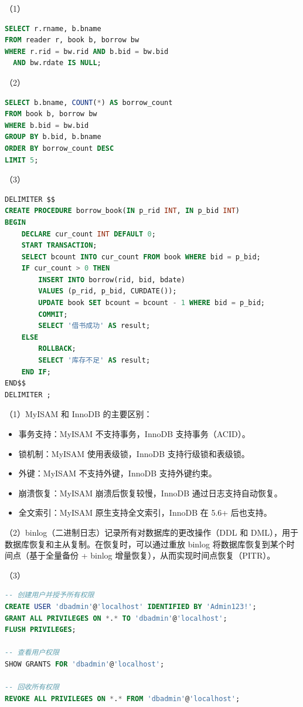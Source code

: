 \documentclass[a4paper,11pt]{article}
\begin{document}

\q
\par （1）
\begin{lstlisting}[language=SQL]
SELECT r.rname, b.bname
FROM reader r, book b, borrow bw
WHERE r.rid = bw.rid AND b.bid = bw.bid
  AND bw.rdate IS NULL;
\end{lstlisting}
\par （2）
\begin{lstlisting}[language=SQL]
SELECT b.bname, COUNT(*) AS borrow_count
FROM book b, borrow bw
WHERE b.bid = bw.bid
GROUP BY b.bid, b.bname
ORDER BY borrow_count DESC
LIMIT 5;
\end{lstlisting}
\par （3）
\begin{lstlisting}[language=SQL]
DELIMITER $$
CREATE PROCEDURE borrow_book(IN p_rid INT, IN p_bid INT)
BEGIN
    DECLARE cur_count INT DEFAULT 0;
    START TRANSACTION;
    SELECT bcount INTO cur_count FROM book WHERE bid = p_bid;
    IF cur_count > 0 THEN
        INSERT INTO borrow(rid, bid, bdate)
        VALUES (p_rid, p_bid, CURDATE());
        UPDATE book SET bcount = bcount - 1 WHERE bid = p_bid;
        COMMIT;
        SELECT '借书成功' AS result;
    ELSE
        ROLLBACK;
        SELECT '库存不足' AS result;
    END IF;
END$$
DELIMITER ;
\end{lstlisting}

\q
\par （1）MyISAM 和 InnoDB 的主要区别：
\begin{itemize}
  \item 事务支持：MyISAM 不支持事务，InnoDB 支持事务（ACID）。
  \item 锁机制：MyISAM 使用表级锁，InnoDB 支持行级锁和表级锁。
  \item 外键：MyISAM 不支持外键，InnoDB 支持外键约束。
  \item 崩溃恢复：MyISAM 崩溃后恢复较慢，InnoDB 通过日志支持自动恢复。
  \item 全文索引：MyISAM 原生支持全文索引，InnoDB 在 5.6+ 后也支持。
\end{itemize}

\par （2）binlog（二进制日志）记录所有对数据库的更改操作（DDL 和 DML），用于数据库恢复和主从复制。在恢复时，可以通过重放 binlog 将数据库恢复到某个时间点（基于全量备份 + binlog 增量恢复），从而实现时间点恢复（PITR）。

\par （3）
\begin{lstlisting}[language=SQL]
-- 创建用户并授予所有权限
CREATE USER 'dbadmin'@'localhost' IDENTIFIED BY 'Admin123!';
GRANT ALL PRIVILEGES ON *.* TO 'dbadmin'@'localhost';
FLUSH PRIVILEGES;

-- 查看用户权限
SHOW GRANTS FOR 'dbadmin'@'localhost';

-- 回收所有权限
REVOKE ALL PRIVILEGES ON *.* FROM 'dbadmin'@'localhost';
\end{lstlisting}
\end{document}
